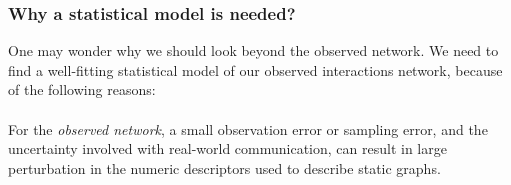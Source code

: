 \documentclass{report}
\begin{document}
\subsubsection{Why a statistical model is needed?}

One may wonder why we should look beyond the observed network. We need to find a well-fitting statistical model of our observed interactions network, because of the following reasons: 

\paragraph{} For the \textit{observed network}, a small observation error or sampling error, and the uncertainty involved with real-world communication, can result in large perturbation in the numeric descriptors used to describe static graphs. 
\end{document}
